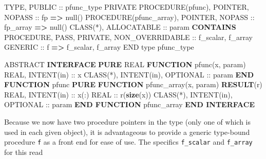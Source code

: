 \documentclass[
  paper=a4,
  ,captions=tableheading
]{scrartcl}
\newenvironment{Shaded}{\begin{snugshade}}{\end{snugshade}}
\newcommand{\DataTypeTok}[1]{\textcolor[rgb]{0.13,0.29,0.53}{#1}}
\newcommand{\FunctionTok}[1]{\textcolor[rgb]{0.13,0.29,0.53}{\textbf{#1}}}
\newcommand{\KeywordTok}[1]{\textcolor[rgb]{0.13,0.29,0.53}{\textbf{#1}}}
\newcommand{\NormalTok}[1]{#1}
\newcommand{\OperatorTok}[1]{\textcolor[rgb]{0.81,0.36,0.00}{\textbf{#1}}}
\begin{document}
\begin{Shaded}
\begin{Highlighting}[]
\DataTypeTok{TYPE}\NormalTok{, }\DataTypeTok{PUBLIC} \DataTypeTok{::}\NormalTok{ pfunc\_type}
   \DataTypeTok{PRIVATE}
   \DataTypeTok{PROCEDURE(pfunc)}\NormalTok{, }\DataTypeTok{POINTER}\NormalTok{, }\DataTypeTok{NOPASS} \DataTypeTok{::}\NormalTok{ fp }\KeywordTok{=}\OperatorTok{\textgreater{}}\NormalTok{ null()}
   \DataTypeTok{PROCEDURE(pfunc\_array)}\NormalTok{, }\DataTypeTok{POINTER}\NormalTok{, }\DataTypeTok{NOPASS} \DataTypeTok{::}\NormalTok{ fp\_array }\KeywordTok{=}\OperatorTok{\textgreater{}}\NormalTok{ null()}
   \DataTypeTok{CLASS(*)}\NormalTok{, }\DataTypeTok{ALLOCATABLE} \DataTypeTok{::}\NormalTok{ param}
\KeywordTok{CONTAINS}
   \DataTypeTok{PROCEDURE}\NormalTok{, }\DataTypeTok{PASS}\NormalTok{, }\DataTypeTok{PRIVATE}\NormalTok{, }\DataTypeTok{NON\_OVERRIDABLE} \DataTypeTok{::}\NormalTok{ f\_scalar, f\_array}
   \DataTypeTok{GENERIC} \DataTypeTok{::}\NormalTok{ f }\KeywordTok{=}\OperatorTok{\textgreater{}}\NormalTok{ f\_scalar, f\_array}
\DataTypeTok{END type}\NormalTok{ pfunc\_type}

\DataTypeTok{ABSTRACT} \KeywordTok{INTERFACE}
   \KeywordTok{PURE} \DataTypeTok{REAL} \KeywordTok{FUNCTION}\NormalTok{ pfunc(x, param)}
      \DataTypeTok{REAL}\NormalTok{, }\DataTypeTok{INTENT(in)} \DataTypeTok{::}\NormalTok{ x}
      \DataTypeTok{CLASS(*)}\NormalTok{, }\DataTypeTok{INTENT(in)}\NormalTok{, }\DataTypeTok{OPTIONAL} \DataTypeTok{::}\NormalTok{ param}
   \KeywordTok{END FUNCTION}\NormalTok{ pfunc}
   \KeywordTok{PURE} \KeywordTok{FUNCTION}\NormalTok{ pfunc\_array(x, param) }\KeywordTok{RESULT}\NormalTok{(r)}
      \DataTypeTok{REAL}\NormalTok{, }\DataTypeTok{INTENT(in)} \DataTypeTok{::}\NormalTok{ x(:)}
      \DataTypeTok{REAL} \DataTypeTok{::}\NormalTok{ r(}\FunctionTok{size}\NormalTok{(x))}
      \DataTypeTok{CLASS(*)}\NormalTok{, }\DataTypeTok{INTENT(in)}\NormalTok{, }\DataTypeTok{OPTIONAL} \DataTypeTok{::}\NormalTok{ param}
   \KeywordTok{END FUNCTION}\NormalTok{ pfunc\_array}
\KeywordTok{END INTERFACE}
\end{Highlighting}
\end{Shaded}

Because we now have two procedure pointers in the type (only one of
which is used in each given object), it is advantageous to provide a
generic type-bound procedure \texttt{f} as a front end for ease of use.
The specifics \texttt{f\_scalar} and \texttt{f\_array} for this read
\end{document}
